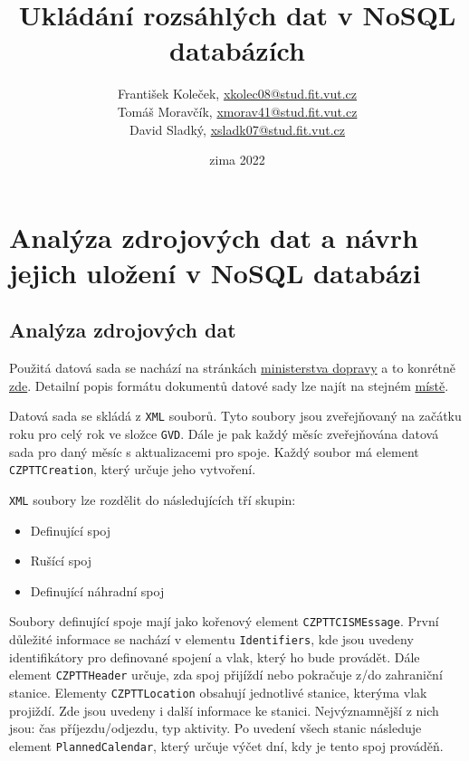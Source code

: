 \documentclass[10pt,xcolor=pdflatex,dvipsnames,table,oneside]{book}
\author{
    František Koleček, \href{mailto:xkolec08@stud.fit.vut.cz}{xkolec08@stud.fit.vut.cz} \\
    Tomáš Moravčík, \href{mailto:xmorav41@stud.fit.vut.cz}{xmorav41@stud.fit.vut.cz} \\
    David Sladký, \href{mailto:xsladk07@stud.fit.vut.cz}{xsladk07@stud.fit.vut.cz}
    }
\title{Ukládání rozsáhlých dat v NoSQL databázích}
\date{zima 2022}
\begin{document}

\hypersetup{pageanchor=false}%
\maketitle
\hypersetup{pageanchor=true}

\tableofcontents

\newpage%

\part{Analýza zdrojových dat a návrh jejich uložení v NoSQL databázi}

\chapter{Analýza zdrojových dat}

Použitá datová sada se nachází na stránkách \href{https://mdcr.cz/Dokumenty/Verejna-doprava/Jizdni-rady,-kalendare-pro-jizdni-rady,-metodi-%281%29/Jizdni-rady-verejne-dopravy}{ministerstva dopravy}
a to konrétně \href{https://portal.cisjr.cz/pub/draha/celostatni/szdc/}{zde}. Detailní popis formátu dokumentů datové sady lze najít na stejném \href{https://portal.cisjr.cz/pub/draha/celostatni/szdc/Popis%20DJ%C5%98_CIS_v1_09.pdf}{místě}.

Datová sada se skládá z \verb|XML| souborů. Tyto soubory jsou zveřejňovaný na začátku roku pro celý rok ve složce \verb|GVD|. Dále je pak každý měsíc zveřejňována datová sada pro daný měsíc s aktualizacemi pro spoje.
Každý soubor má element \verb|CZPTTCreation|, který určuje jeho vytvoření.

\verb|XML| soubory lze rozdělit do následujících tří skupin:
\begin{itemize}
    \item Definující spoj
    \item Rušící spoj
    \item Definující náhradní spoj
\end{itemize}
Soubory definující spoje mají jako kořenový element \verb|CZPTTCISMEssage|. První důležité informace se nachází v elementu \verb|Identifiers|,
kde jsou uvedeny identifikátory pro definované spojení a vlak, který ho bude provádět. Dále element \verb|CZPTTHeader| určuje, zda spoj
přijíždí nebo pokračuje z/do zahraniční stanice. Elementy \verb|CZPTTLocation| obsahují jednotlivé stanice, kterýma vlak projiždí. Zde jsou
uvedeny i další informace ke stanici. Nejvýznamnější z nich jsou: čas příjezdu/odjezdu, typ aktivity. Po uvedení všech stanic následuje
element \verb|PlannedCalendar|, který určuje výčet dní, kdy je tento spoj prováděň.
\end{document}
